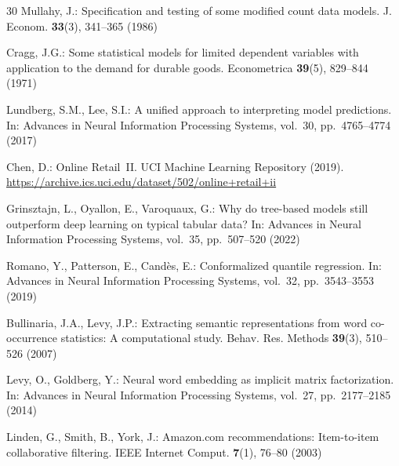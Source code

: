 \documentclass[pdflatex,sn-mathphys-num]{sn-jnl}
\theoremstyle{thmstyleone}
\theoremstyle{thmstyletwo}
\theoremstyle{thmstylethree}
\begin{document}
\begin{thebibliography}{30}
Mullahy, J.: Specification and testing of some modified count data models.
J. Econom. \textbf{33}(3), 341--365 (1986)

Cragg, J.G.: Some statistical models for limited dependent variables with
application to the demand for durable goods. Econometrica \textbf{39}(5),
829--844 (1971)

Lundberg, S.M., Lee, S.I.: A unified approach to interpreting model predictions.
In: Advances in Neural Information Processing Systems, vol.~30,
pp.~4765--4774 (2017)

Chen, D.: Online Retail~II. UCI Machine Learning Repository (2019).
\url{https://archive.ics.uci.edu/dataset/502/online+retail+ii}

Grinsztajn, L., Oyallon, E., Varoquaux, G.: Why do tree-based models still
outperform deep learning on typical tabular data? In: Advances in Neural
Information Processing Systems, vol.~35, pp.~507--520 (2022)

Romano, Y., Patterson, E., Cand\`{e}s, E.: Conformalized quantile regression.
In: Advances in Neural Information Processing Systems, vol.~32,
pp.~3543--3553 (2019)

Bullinaria, J.A., Levy, J.P.: Extracting semantic representations from word
co-occurrence statistics: A computational study.
Behav. Res. Methods \textbf{39}(3), 510--526 (2007)

Levy, O., Goldberg, Y.: Neural word embedding as implicit matrix factorization.
In: Advances in Neural Information Processing Systems, vol.~27,
pp.~2177--2185 (2014)

Linden, G., Smith, B., York, J.: Amazon.com recommendations: Item-to-item
collaborative filtering. IEEE Internet Comput. \textbf{7}(1), 76--80 (2003)

\end{thebibliography}
\endgroup
\end{document}
